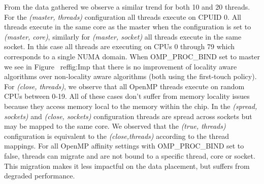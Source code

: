 From the data gathered we observe a similar trend for both 10 and 20 threads. 
For the \textit{(master, threads)} configuration all threads execute on CPUID 0. 
All threads execute in the same core as the master when the configuration is set to \textit{(master, core)}, similarly for \textit{(master, socket)} all threads execute in the same socket. In this case all threads are executing on CPUs 0 through 79 which corresponds to a single NUMA domain. When OMP\_PROC\_BIND set to master we see in Figure ~ref{fig:Imp} that there is no improvement of locality aware algorithms over non-locality aware algorithms (both using the first-touch policy).
For \textit{(close, threads)}, we observe that all OpenMP threads execute on random CPUs between 0-19. All of these cases don't suffer from memory locality issues because they access memory local to the memory within the chip.
In the \textit{(spread, sockets)} and \textit{(close, sockets)} configuration threads are spread across sockets but may be mapped to the same core. We observed that the \textit{(true, threads)} configuration is equivalent to the \textit{(close,threads)} according to the thread mappings.
For all OpenMP affinity settings  with OMP\_PROC\_BIND set to false, threads can migrate and are not bound to a specific thread, core or socket. This migration makes it less impactful on the data placement, but suffers from degraded performance.




